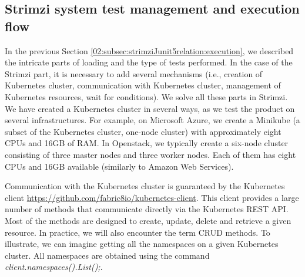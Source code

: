 \subsection{Strimzi system test management and execution flow}
\label{02:subsec:strimzisystemtestsexecution}

In the previous Section \ref{02:subsec:strimziJunit5relation:execution}, we described the intricate parts of loading and the type of tests performed. In the case of the Strimzi part, it is necessary to add several mechanisms (i.e., creation of Kubernetes cluster, communication with Kubernetes cluster, management of Kubernetes resources, wait for conditions). We solve all these parts in Strimzi. We have created a Kubernetes cluster in several ways, as we test the product on several infrastructures. For example, on Microsoft Azure, we create a Minikube (a subset of the Kubernetes cluster, one-node cluster) with approximately eight CPUs and 16GB of RAM. In Openstack, we typically create a six-node cluster consisting of three master nodes and three worker nodes. Each of them has eight CPUs and 16GB available (similarly to Amazon Web Services).

Communication with the Kubernetes cluster is guaranteed by the Kubernetes client \url {https://github.com/fabric8io/kubernetes-client}. This client provides a large number of methods that communicate directly via the Kubernetes REST API. Most of the methods are designed to create, update, delete and retrieve a given resource. In practice, we will also encounter the term CRUD methods. To illustrate, we can imagine getting all the namespaces on a given Kubernetes cluster. All namespaces are obtained using the command \emph{client.namespaces().List();}.

